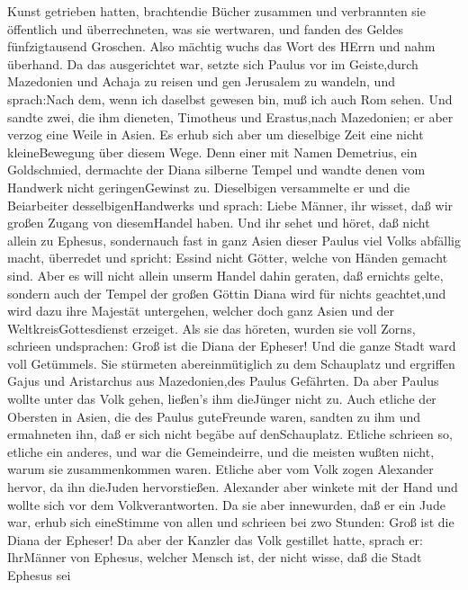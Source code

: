 Kunst getrieben hatten, brachtendie Bücher zusammen und verbrannten sie
öffentlich und überrechneten, was sie wertwaren, und fanden des Geldes
fünfzigtausend Groschen.  Also mächtig wuchs das Wort des
HErrn und nahm überhand.  Da das ausgerichtet war, setzte
sich Paulus vor im Geiste,durch Mazedonien und Achaja zu reisen und gen
Jerusalem zu wandeln, und sprach:Nach dem, wenn ich daselbst gewesen
bin, muß ich auch Rom sehen.  Und sandte zwei, die ihm
dieneten, Timotheus und Erastus,nach Mazedonien; er aber verzog eine
Weile in Asien.  Es erhub sich aber um dieselbige Zeit eine
nicht kleineBewegung über diesem Wege.  Denn einer mit
Namen Demetrius, ein Goldschmied, dermachte der Diana silberne Tempel
und wandte denen vom Handwerk nicht geringenGewinst zu. 
Dieselbigen versammelte er und die Beiarbeiter desselbigenHandwerks und
sprach: Liebe Männer, ihr wisset, daß wir großen Zugang von diesemHandel
haben.  Und ihr sehet und höret, daß nicht allein zu
Ephesus, sondernauch fast in ganz Asien dieser Paulus viel Volks
abfällig macht, überredet und spricht: Essind nicht Götter, welche von
Händen gemacht sind.  Aber es will nicht allein unserm
Handel dahin geraten, daß ernichts gelte, sondern auch der Tempel der
großen Göttin Diana wird für nichts geachtet,und wird dazu ihre Majestät
untergehen, welcher doch ganz Asien und der WeltkreisGottesdienst
erzeiget.  Als sie das höreten, wurden sie voll Zorns,
schrieen undsprachen: Groß ist die Diana der Epheser!  Und
die ganze Stadt ward voll Getümmels. Sie stürmeten abereinmütiglich zu
dem Schauplatz und ergriffen Gajus und Aristarchus aus Mazedonien,des
Paulus Gefährten.  Da aber Paulus wollte unter das Volk
gehen, ließen's ihm dieJünger nicht zu.  Auch etliche der
Obersten in Asien, die des Paulus guteFreunde waren, sandten zu ihm und
ermahneten ihn, daß er sich nicht begäbe auf denSchauplatz.
 Etliche schrieen so, etliche ein anderes, und war die
Gemeindeirre, und die meisten wußten nicht, warum sie zusammenkommen
waren.  Etliche aber vom Volk zogen Alexander hervor, da
ihn dieJuden hervorstießen. Alexander aber winkete mit der Hand und
wollte sich vor dem Volkverantworten.  Da sie aber
innewurden, daß er ein Jude war, erhub sich eineStimme von allen und
schrieen bei zwo Stunden: Groß ist die Diana der Epheser! 
Da aber der Kanzler das Volk gestillet hatte, sprach er: IhrMänner von
Ephesus, welcher Mensch ist, der nicht wisse, daß die Stadt Ephesus sei
